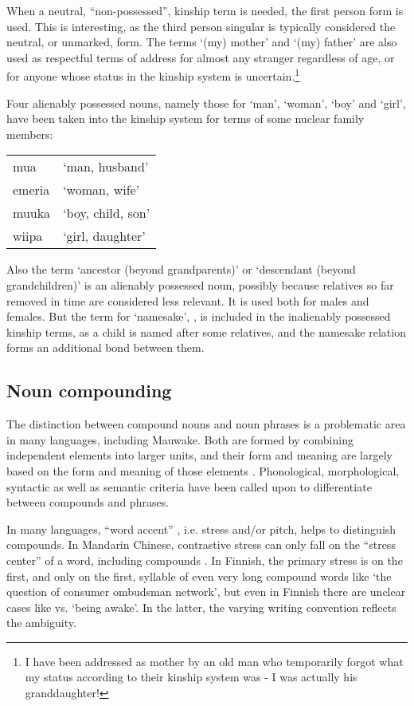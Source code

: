 When a neutral, ``non-possessed'', kinship term is needed, the first person form is used. This is interesting, as the third person singular is typically considered the neutral, or unmarked, form. The terms `(my) mother' and `(my) father' are also used as respectful terms of address for almost any stranger regardless of age, or for anyone whose status in the kinship system is uncertain.\footnote{I have been addressed as {\textquotedbl}mother{\textquotedbl} by an old man who temporarily forgot what my status according to their kinship system was - I was actually his granddaughter!}

Four alienably possessed nouns, namely those for `man', `woman', `boy' and `girl', have been taken into the kinship system for terms of some nuclear family members: 

\begin{tabular}{ll}
mua &`man, husband'\\
emeria &`woman, wife'\\
muuka &`boy, child, son'\\
wiipa &`girl, daughter'\\
\end{tabular}

Also the term  `ancestor (beyond grandparents)' or `descendant (beyond grandchildren)' is an alienably possessed noun, possibly because relatives so far removed in time are considered less relevant. It is used both for males and females. But the term for `namesake', , is included in the inalienably possessed kinship terms, as a child is named after some relatives, and the namesake relation forms an additional bond between them.

\subsection{Noun compounding}
{}
The distinction between compound nouns and noun phrases is a problematic area in many languages, including Mauwake. Both are formed by combining independent elements into larger units, and their form and meaning are largely based on the form and meaning of those elements \citep[40]{Anderson1985a}. Phonological, morphological, syntactic as well as semantic criteria have been called upon to differentiate between compounds and phrases.

In many languages, ``word accent'' \citep[204]{Lyons1968}, i.e. stress and/or pitch, helps to distinguish compounds. In Mandarin Chinese, contrastive stress can only fall on the ``stress center'' of a word, including compounds \citep[41]{Anderson1985a}. In Finnish, the primary stress is on the first, and only on the first, syllable of even very long compound words like  `the question of consumer ombudsman network', but even in Finnish there are unclear cases like  vs. \textstyleEmphasizedWords{} `being awake'. In the latter, the varying writing convention reflects the ambiguity. 

